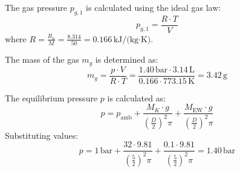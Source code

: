 The gas pressure \( p_{g,1} \) is calculated using the ideal gas law:  
\[
p_{g,1} = \frac{R \cdot T}{V}
\]  
where \( R = \frac{R_u}{M} = \frac{8.314}{50} = 0.166 \, \text{kJ/(kg·K)} \).  

The mass of the gas \( m_g \) is determined as:  
\[
m_g = \frac{p \cdot V}{R \cdot T} = \frac{1.40 \, \text{bar} \cdot 3.14 \, \text{L}}{0.166 \cdot 773.15 \, \text{K}} = 3.42 \, \text{g}
\]  

The equilibrium pressure \( p \) is calculated as:  
\[
p = p_{\text{amb}} + \frac{M_K \cdot g}{\left(\frac{D}{2}\right)^2 \pi} + \frac{M_{\text{EW}} \cdot g}{\left(\frac{D}{2}\right)^2 \pi}
\]  
Substituting values:  
\[
p = 1 \, \text{bar} + \frac{32 \cdot 9.81}{\left(\frac{5}{2}\right)^2 \pi} + \frac{0.1 \cdot 9.81}{\left(\frac{5}{2}\right)^2 \pi} = 1.40 \, \text{bar}
\]